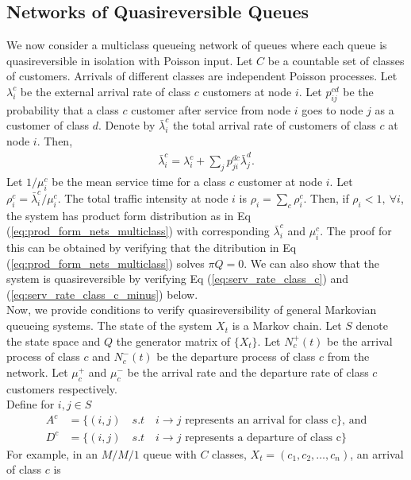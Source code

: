 \documentclass[all-lectures.tex]{subfiles}
\begin{document}
\subsection{Networks of Quasireversible Queues}
We now consider a multiclass queueing network of queues where each queue is quasireversible in isolation with Poisson input. Let $C$ be a countable set of classes of customers. Arrivals of different classes are independent Poisson processes. Let $\lambda^c_i$ be the external arrival rate of class $c$ customers at node $i$. Let $p^{cd}_{ij}$ be the probability that a class $c$ customer after service from node $i$ goes to node $j$ as a customer of class $d$. Denote by $\bar{\lambda}^c_i$ the total arrival rate of customers of class $c$ at node $i$. Then,
\begin{align}
\bar{\lambda}^c_i = \lambda^c_i + \sum_{j} p^{dc}_{ji} \bar{\lambda}^d_j.
\end{align}
Let $1/\mu^c_i$ be the mean service time for a class $c$ customer at node $i$. Let $\rho^c_i = \bar{\lambda}^c_i/\mu^c_i$. The total traffic intensity at node $i$ is $\rho_i = \sum_c \rho^c_i$. Then, if $\rho_i < 1, \ \forall i$, the system has product form distribution as in Eq (\ref{eq:prod_form_nets_multiclass}) with corresponding $\bar{\lambda}^c_i$ and $\mu^c_i$. The proof for this can be obtained by verifying that the ditribution in Eq (\ref{eq:prod_form_nets_multiclass}) solves $\pi Q =0$. We can also show that the system is quasireversible by verifying Eq (\ref{eq:serv_rate_class_c}) and (\ref{eq:serv_rate_class_c_minus}) below.\\
\indent Now, we provide conditions to verify quasireversibility of general Markovian queueing systems. The state of the system $X_t$ is a Markov chain. Let $S$ denote the state space and $Q$ the generator matrix of $\{X_t\}$. Let $N_c^+ (t)$  be the arrival process of class $c$ and $N_c^-(t)$ be the departure process of class $c$ from the network. Let  $\mu_c^+$ and $\mu_c^-$ be the arrival rate and the departure rate of class $c$ customers respectively. \\ 
\indent Define for $i,j \in S$
\begin{align*}
A^c &= \{(i,j) \quad s.t \quad i \to j \text{ represents an arrival for class c}\} \text{, and} \\
D^c &= \{(i,j) \quad s.t \quad i \to j \text{ represents a departure of class c}\}
\end{align*}
For example, in an $M/M/1$ queue with $C$ classes, $X_t = (c_1, c_2, \dots, c_n)$, an arrival of class $c$ is 
\end{document}
